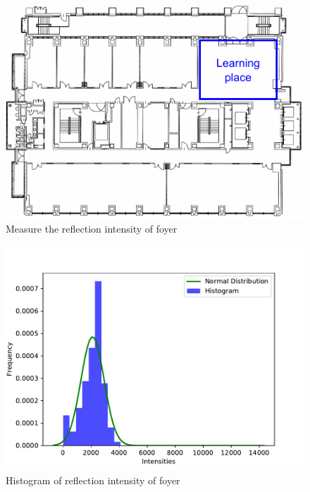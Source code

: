   \begin{figure}[h]
    \centering
    \includegraphics[keepaspectratio, scale=0.50] {images/pdf/RobotGuidance_exp3_foyer}
    \captionsetup{justification=raggedright} %
    \caption{Measure the reflection intensity of foyer}
    \label{Fig:RobotGuidance_exp3_foyer}
  \end{figure}

  \begin{figure}[h]
    \centering
    \includegraphics[keepaspectratio, scale=0.50] {images/pdf/RobotGuidance_plot_reflection_intensities_of_foyer}
    \captionsetup{justification=raggedright} %
    \caption{Histogram of reflection intensity of foyer}
    \label{Fig:Histogram of reflection intensity of foyer}
  \end{figure}

